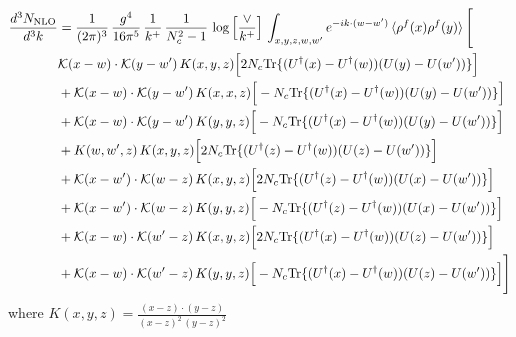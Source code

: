 \documentclass[9pt]{article}
\numberwithin{equation}{section}
\begin{document}
\begin{align}
\frac{d^{3}N_{\mathrm{NLO}}}{d^{3}k} & = \frac{1}{(2\pi)^{3}}\,\frac{g^{4}}{16\pi^{5}}\,\frac{1}{k^{+}}\,\frac{1}{N^{2}_{c}-1}\,\log\Big[\frac{\vee}{k^{+}}\Big]\,\int_{x,y,z,w,w'}e^{-ik\cdot (w-w')}\,\langle\rho^{f}(x)\rho^{f}(y) \rangle\,\Bigg[ \notag\\ & \mathcal K(x-w)\cdot\mathcal K(y-w')\,K(x,y,z)\Big[2 N_{c}{\rm Tr}\{(U^\dagger(x)-U^\dagger(w))(U(y)-U(w'))\}\Big]\notag\\
&+\mathcal K(x-w)\cdot\mathcal K(y-w')\,K(x,x,z)\Big[-N_{c}{\rm Tr}\{(U^\dagger(x)-U^\dagger(w))(U(y)-U(w'))\}\Big]\notag\\
&+\mathcal K(x-w)\cdot\mathcal K(y-w')\,K(y,y,z)\Big[-N_{c}{\rm Tr}\{(U^\dagger(x)-U^\dagger(w))(U(y)-U(w'))\}\Big]\notag\\
&+K(w,w',z)\,K(x,y,z)\Big[2 N_{c}{\rm Tr}\{(U^\dagger(z)-U^\dagger(w))(U(z)-U(w'))\}\Big]\notag\\
&+\mathcal K(x-w')\cdot\mathcal K(w-z)\,K(x,y,z)\Big[2 N_{c}{\rm Tr}\{(U^\dagger(z)-U^\dagger(w))(U(x)-U(w'))\}\Big]\notag\\
&+\mathcal K(x-w')\cdot\mathcal K(w-z)\,K(y,y,z)\Big[-N_{c}{\rm Tr}\{(U^\dagger(z)-U^\dagger(w))(U(x)-U(w'))\}\Big]\notag\\
&+\mathcal K(x-w)\cdot\mathcal K(w'-z)\,K(x,y,z)\Big[2 N_{c}{\rm Tr}\{(U^\dagger(x)-U^\dagger(w))(U(z)-U(w'))\}\Big]\notag\\
&+\mathcal K(x-w)\cdot\mathcal K(w'-z)\,K(y,y,z)\Big[-N_{c}{\rm Tr}\{(U^\dagger(x)-U^\dagger(w))(U(z)-U(w'))\}\Big]\Bigg]
\end{align}
where $K(x,y,z) = \frac{(x-z)\cdot (y-z)}{(x-z)^{2}\, (y-z)^{2}}$
\end{document}
